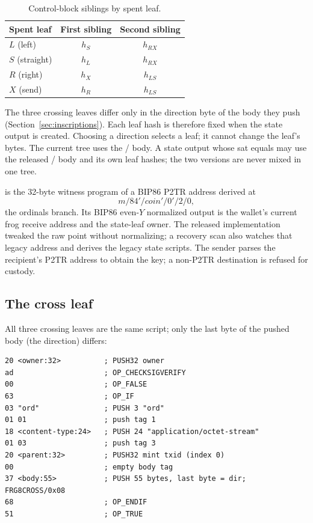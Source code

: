 \begin{table}[H]
\centering
\small
\caption{Control-block siblings by spent leaf.}
\label{tab:control}
\begin{tabular}{@{}lcc@{}}
\toprule
\textbf{Spent leaf} & \textbf{First sibling} & \textbf{Second sibling} \\
\midrule
$L$ (left)     & $h_S$ & $h_{RX}$ \\
$S$ (straight) & $h_L$ & $h_{RX}$ \\
$R$ (right)    & $h_X$ & $h_{LS}$ \\
$X$ (send)     & $h_R$ & $h_{LS}$ \\
\bottomrule
\end{tabular}
\end{table}

The three crossing leaves differ only in the direction byte of the body they
push (Section~\ref{sec:inscriptions}). Each leaf hash is therefore fixed when
the state output is created. Choosing a direction selects a leaf; it cannot
change the leaf's bytes. The current tree uses the
/ body. A state output whose sat equals
 may use the released
/ body and its own leaf hashes; the two versions
are never mixed in one tree.

 is the 32-byte witness program of a BIP86 P2TR address
derived at
\begin{equation}
m/84'/\mathit{coin}'/0'/2/0,
\end{equation}
the ordinals branch. Its BIP86 even-$Y$ normalized output is the wallet's
current frog receive address and the state-leaf owner. The released
implementation tweaked the raw point without normalizing; a recovery scan
also watches that legacy address and derives the legacy state scripts. The
sender parses the recipient's P2TR address to obtain the key; a non-P2TR
destination is refused for custody.

\subsection{The cross leaf}

All three crossing leaves are the same script; only the last byte of the
pushed body (the direction) differs:
\begin{lstlisting}[language={},caption={Cross leaf template.},label={lst:cross-leaf}]
20 <owner:32>          ; PUSH32 owner
ad                     ; OP_CHECKSIGVERIFY
00                     ; OP_FALSE
63                     ; OP_IF
03 "ord"               ; PUSH 3 "ord"
01 01                  ; push tag 1
18 <content-type:24>   ; PUSH 24 "application/octet-stream"
01 03                  ; push tag 3
20 <parent:32>         ; PUSH32 mint txid (index 0)
00                     ; empty body tag
37 <body:55>           ; PUSH 55 bytes, last byte = dir; FRG8CROSS/0x08
68                     ; OP_ENDIF
51                     ; OP_TRUE
\end{lstlisting}

